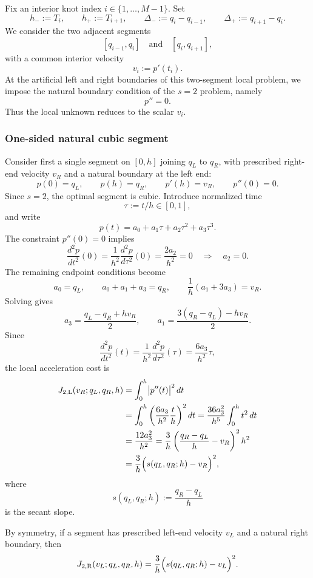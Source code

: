 Fix an interior knot index \(i\in\{1,\dots,M-1\}\).
Set
\[
h_-:=T_i,\qquad h_+:=T_{i+1},
\qquad
\Delta_-:=q_i-q_{i-1},\qquad
\Delta_+:=q_{i+1}-q_i.
\]
We consider the two adjacent segments
\[
[q_{i-1},q_i]
\quad\text{and}\quad
[q_i,q_{i+1}],
\]
with a common interior velocity
\[
v_i:=p'(t_i).
\]
At the artificial left and right boundaries of this two-segment local problem, we impose the natural boundary condition of the \(s=2\) problem, namely
\[
p''=0.
\]
Thus the local unknown reduces to the scalar \(v_i\).

\subsubsection{One-sided natural cubic segment}
\label{subsubsec:phase4_s2_one_sided}

Consider first a single segment on \([0,h]\) joining \(q_L\) to \(q_R\), with prescribed right-end velocity \(v_R\) and a natural boundary at the left end:
\[
p(0)=q_L,\qquad p(h)=q_R,\qquad p'(h)=v_R,\qquad p''(0)=0.
\]
Since \(s=2\), the optimal segment is cubic.
Introduce normalized time
\[
\tau:=t/h\in[0,1],
\]
and write
\[
p(t)=a_0+a_1\tau+a_2\tau^2+a_3\tau^3.
\]
The constraint \(p''(0)=0\) implies
\[
\frac{d^2p}{dt^2}(0)=\frac{1}{h^2}\frac{d^2p}{d\tau^2}(0)=\frac{2a_2}{h^2}=0
\quad\Longrightarrow\quad
a_2=0.
\]
The remaining endpoint conditions become
\[
a_0=q_L,
\qquad
a_0+a_1+a_3=q_R,
\qquad
\frac{1}{h}(a_1+3a_3)=v_R.
\]
Solving gives
\[
a_3=\frac{q_L-q_R+h v_R}{2},
\qquad
a_1=\frac{3(q_R-q_L)-h v_R}{2}.
\]
Since
\[
\frac{d^2p}{dt^2}(t)=\frac{1}{h^2}\frac{d^2p}{d\tau^2}(\tau)=\frac{6a_3}{h^2}\tau,
\]
the local acceleration cost is
\begin{align}
J_{2,\mathrm{L}}(v_R;q_L,q_R,h)
&=
\int_0^h \bigl|p''(t)\bigr|^2\,dt \notag\\
&=
\int_0^h \left(\frac{6a_3}{h^2}\frac{t}{h}\right)^2 dt
=
\frac{36a_3^2}{h^5}\int_0^h t^2\,dt \notag\\
&=
\frac{12a_3^2}{h^2}
=
\frac{3}{h}\left(\frac{q_R-q_L}{h}-v_R\right)^2 h^2
\notag\\
&=
\frac{3}{h}\Bigl(s(q_L,q_R;h)-v_R\Bigr)^2,
\label{eq:phase4_s2_left_cost}
\end{align}
where
\begin{equation}
\label{eq:phase4_s2_secant}
s(q_L,q_R;h):=\frac{q_R-q_L}{h}
\end{equation}
is the secant slope.

By symmetry, if a segment has prescribed left-end velocity \(v_L\) and a natural right boundary, then
\begin{equation}
\label{eq:phase4_s2_right_cost}
J_{2,\mathrm{R}}(v_L;q_L,q_R,h)
=
\frac{3}{h}\Bigl(s(q_L,q_R;h)-v_L\Bigr)^2.
\end{equation}

